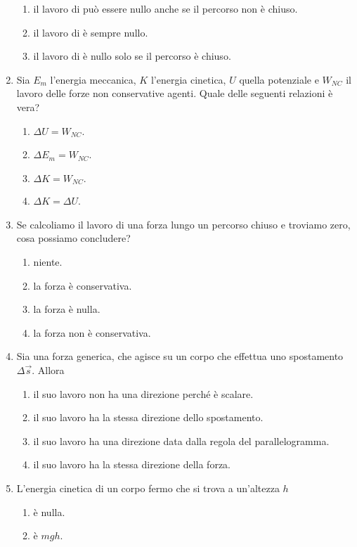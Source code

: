 \documentclass{article}
\begin{document}
\begin{enumerate}
\begin{enumerate}[label=\Alph*.]
    \item il lavoro di  può essere nullo anche se il percorso non è chiuso.
    \item il lavoro di  è sempre nullo.
    \item il lavoro di  è nullo solo se il percorso è chiuso.
  \end{enumerate}
  \item Sia $E_m$ l'energia meccanica, $K$ l'energia cinetica, $U$ quella potenziale e $W_{NC}$ il lavoro delle forze non conservative agenti. Quale delle seguenti relazioni è vera?
  \begin{enumerate}[label=\Alph*.]
    \item $\Delta U=W_{NC}$.
    \item $\Delta E_m=W_{NC}$.
    \item $\Delta K=W_{NC}.$
    \item $\Delta K = \Delta U$.
  \end{enumerate}
  \item Se calcoliamo il lavoro di una forza lungo un percorso chiuso e troviamo zero, cosa possiamo concludere?
  \begin{enumerate}[label=\Alph*.]
    \item niente.
    \item la forza è conservativa.
    \item la forza è nulla.
    \item la forza non è conservativa.
  \end{enumerate}
  \item Sia  una forza generica, che agisce su un corpo che effettua uno spostamento $\Delta \vec{s}$. Allora
  \begin{enumerate}[label=\Alph*.]
    \item il suo lavoro non ha una direzione perché è scalare.
    \item il suo lavoro ha la stessa direzione dello spostamento.
    \item il suo lavoro ha una direzione data dalla regola del parallelogramma.
    \item il suo lavoro ha la stessa direzione della forza.
  \end{enumerate}
  \item L'energia cinetica di un corpo fermo che si trova a un'altezza $h$
  \begin{enumerate}[label=\Alph*.]
    \item è nulla.
    \item è $mgh$.

\end{enumerate}
\end{enumerate}
\end{document}
